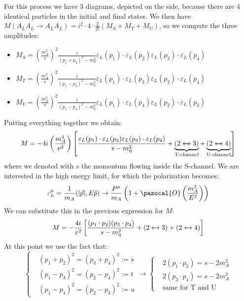 \documentclass[../main.tex]{subfiles}
\begin{document}
For this process we have 3 diagrams, depicted on the side, because there are 4 identical particles in the initial and final states.
We then have $M(A_LA_L\to A_LA_L)=i^2\cdot4\cdot\frac{2}{2!}(M_S+M_T+M_U)$, so we compute the three amplitudes:
\begin{itemize}
    \item $M_S=\left(\frac{m_A^2}{v}\right)^2\frac{i}{(p_1+p_2)^2-m_\eta^2}\varepsilon_L(p_1)\cdot\varepsilon_L(p_2)\varepsilon_L(p_3)\cdot\varepsilon_L(p_4)$
    \item $M_T=\left(\frac{m_A^2}{v}\right)^2\frac{i}{(p_1-p_3)^2-m_\eta^2}\varepsilon_L(p_1)\cdot\varepsilon_L(p_3)\varepsilon_L(p_2)\cdot\varepsilon_L(p_4)$
    \item $M_V=\left(\frac{m_A^2}{v}\right)^2\frac{i}{(p_1-p_4)^2-m_\eta^2}\varepsilon_L(p_1)\cdot\varepsilon_L(p_4)\varepsilon_L(p_2)\cdot\varepsilon_L(p_3)$
\end{itemize}
Putting everything together we obtain:
\[
M=-4i\left(\frac{m_A^4}{v^2}\right)\left[\frac{\varepsilon_L(p_1)\cdot\varepsilon_L(p_2)\varepsilon_L(p_3)\cdot\varepsilon_L(p_4)}{s-m_\eta^2}+\underbrace{(2\xleftrightarrow[]{}3)}_{\text{T-channel}}+\underbrace{(2\xleftrightarrow[]{}4)}_{\text{U-channel}}\right]
\]
where we denoted with $s$ the momentum flowing inside the S-channel. We are interested in the high energy limit, for which the polarization becomes:
\[
\varepsilon_L^\mu=\frac{1}{m_A}(|\Vec{p}|,E\hat{p})\to\frac{P^\mu}{m_A}\left(1+\pazocal{O}\left(\frac{m_A^2}{E^2}\right)\right)
\]
We can substitute this in the previous expression for $M$:
\[
M=-\frac{4i}{v^2}\left[\frac{(p_1\cdot p_2)(p_3\cdot p_4)}{s-m_\eta^2}+(2\xleftrightarrow[]{}3)+(2\xleftrightarrow[]{}4)\right]
\]
At this point we use the fact that:
\[
\left\{
\begin{aligned}
&(p_1+p_2)^2=(p_3+p_4)^2:=s\\
&(p_1-p_3)^2=(p_2-p_4)^2:=t\\
&(p_1-p_4)^2=(p_2-p_3)^2:=u
\end{aligned}
\right.
\to
\left\{
\begin{aligned}
&2(p_1\cdot p_2)=s-2m_A^2\\    
&2(p_3\cdot p_4)=s-2m_A^2\\
&\text{same for T and U}
\end{aligned}
\right.
\]
\end{document}

